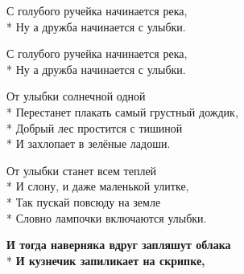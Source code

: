 \medskip

\begin{minipage}{\linewidth}
\hspace*{1.5em}С голубого ручейка начинается река,\\*
\hspace*{1.5em}Ну а дружба начинается с улыбки.\\
\end{minipage}\par\medskip\nobreak

\medskip

\begin{minipage}{\linewidth}
\hspace*{1.5em}С голубого ручейка начинается река,\\*
\hspace*{1.5em}Ну а дружба начинается с улыбки.\\
\end{minipage}\par\medskip\nobreak

\medskip

\begin{minipage}{\linewidth}
От улыбки солнечной одной\\*
Перестанет плакать самый грустный дождик,\\*
Добрый лес простится с тишиной\\*
И захлопает в зелёные ладоши.\\
\end{minipage}\par\medskip\nobreak

\medskip

\begin{minipage}{\linewidth}
От улыбки станет всем теплей\\*
И слону, и даже маленькой улитке,\\*
Так пускай повсюду на земле\\*
Словно лампочки включаются улыбки.\\
\end{minipage}\par\medskip\nobreak

\medskip

\begin{minipage}{\linewidth}
\hspace*{1.5em}\textbf{И тогда наверняка вдруг запляшут облака}\\*
\hspace*{1.5em}\textbf{И кузнечик запиликает на скрипке,}\\
\end{minipage}\par\medskip\nobreak

